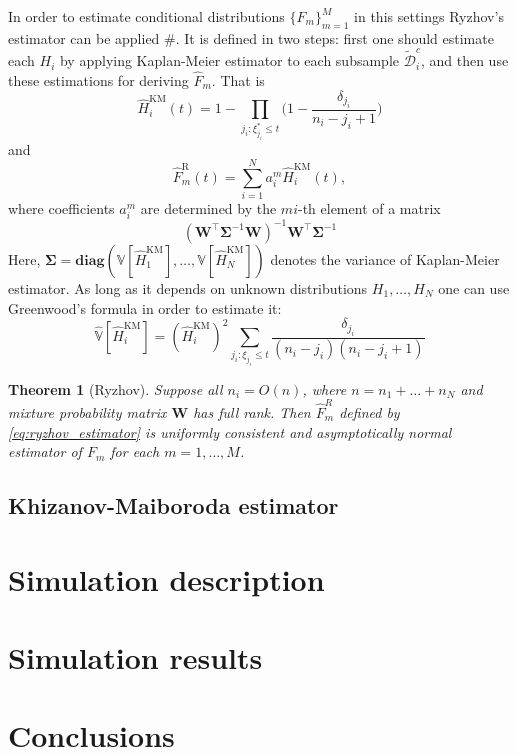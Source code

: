 \documentclass[12pt,reqno,a4paper,oneside,draft]{article}
\theoremstyle{plain}
\newtheorem{thm}{Theorem}[section]
\theoremstyle{definition}
\theoremstyle{remark}
\begin{document}
In order to estimate conditional distributions $\{F_m\}_{m=1}^M$ in this settings Ryzhov's estimator can be applied $\#$. It is defined in two steps: first one should estimate each $H_i$ by applying Kaplan-Meier estimator to each subsample $\tilde{\mathcal D}^c_i$, and then use these estimations for deriving $\hat F_m$. That is
\begin{equation}
\hat H^{\mathrm{KM}}_i (t) = 1 - \prod _{j_i:\xi ^*_{j_i} \leq t} \Bigg(1 - \frac {\delta _{j_i}}{n_i - j_i + 1}\Bigg)
\end{equation}
and
\begin{equation}
\label{eq:ryzhov_estimator}
\hat F^{\mathrm{R}}_m(t) = \sum _{i=1}^N a_i^m \hat H^{\mathrm{KM}}_i(t),
\end{equation}
where coefficients $a_i^m$ are determined by the $mi$-th element of a matrix
\begin{equation}
(\mathbf W^\top \boldsymbol{\Sigma}^{-1}\mathbf W)^{-1} \mathbf W^\top \boldsymbol{\Sigma}^{-1}
\end{equation}
Here, $\boldsymbol{\Sigma} = \mathbf{diag}(\mathbb V [\hat H^{\mathrm{KM}}_1], \ldots, \mathbb V[\hat H^{\mathrm{KM}}_N])$ denotes the variance of Kaplan-Meier estimator. As long as it depends on unknown distributions $H_1, \ldots, H_N$ one can use Greenwood's formula in order to estimate it:
\begin{equation}
\hat{\mathbb V}[\hat H^{\mathrm{KM}}_i] = (\hat H^{\mathrm{KM}}_i)^2 \sum _{j_i:\xi _{j_i} \leq t}\frac {\delta _{j_i}}{(n_i - j_i)(n_i - j_i + 1)}
\end{equation}
\begin{thm}[Ryzhov]
Suppose all $n_i = O(n)$, where $n = n_1 + \ldots + n_N$ and mixture probability matrix $\mathbf W$ has full rank. Then $\hat F^R_m$ defined by \eqref{eq:ryzhov_estimator} is uniformly consistent and asymptotically normal estimator of $F_m$ for each $m=1,\ldots , M$.
\end{thm}


\subsection{Khizanov-Maiboroda estimator}







\section{Simulation description}
\label{sec:Simulation_description}

\section{Simulation results}
\label{sec:Simulation_results}

\section{Conclusions}
\label{sec:Conclusions}
\end{document}
